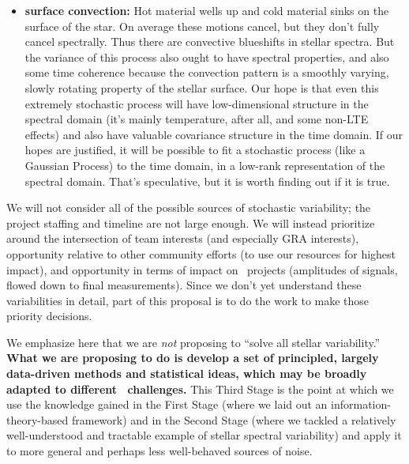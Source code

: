 \documentclass[12pt, letterpaper]{article}
\begin{document}
\begin{itemize}
\item
\textbf{surface convection:}
Hot material wells up and cold material sinks on the surface of the star.
On average these motions cancel, but they don't fully cancel spectrally.
Thus there are convective blueshifts in stellar spectra.
But the variance of this process also ought to have spectral
properties, and also some time coherence because the convection
pattern is a smoothly varying, slowly rotating property of the stellar
surface.
Our hope is that even this extremely stochastic process will have
low-dimensional structure in the spectral domain (it's mainly
temperature, after all, and some non-LTE effects) and also have
valuable covariance structure in the time domain.
If our hopes are justified, it will be possible to fit a stochastic
process (like a Gaussian Process) to the time domain, in a low-rank
representation of the spectral domain.
That's speculative, but it is worth finding out if it is true.
\end{itemize}

\noindent
We will not consider all of the possible sources of stochastic variability;
the project staffing and timeline are not large enough.
We will instead prioritize around the intersection of team interests (and
especially GRA interests), opportunity relative to other community efforts
(to use our resources for highest impact), and opportunity in terms of
impact on \EPRV\ projects (amplitudes of signals, flowed down to final measurements).
Since we don't yet understand these variabilities in detail, part of this
proposal is to do the work to make those priority decisions.

We emphasize here that we are \textit{not} proposing to ``solve
all stellar variability.'' \textbf{What we are proposing to do is develop a set of 
principled, largely data-driven methods and statistical ideas, which may be 
broadly adapted to different \EPRV\ challenges.} This Third Stage is the 
point at which we use the knowledge gained in the First Stage (where we 
laid out an information-theory-based framework) and in the Second Stage 
(where we tackled a relatively well-understood and tractable example 
of stellar spectral variability) and apply it to more general and perhaps
less well-behaved sources of noise.
\end{document}

